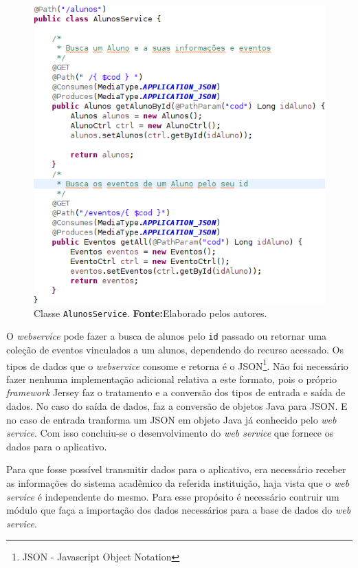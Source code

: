 		\begin{figure}[h!]
			\centerline{\includegraphics[scale=0.7]{./imagens/2_q_metodologico/qm13.png}}
			\caption[Classe \texttt{AlunosService}]{Classe \texttt{AlunosService}.
			\textbf{Fonte:}Elaborado pelos autores.}
			\label{fig:qm13}
		\end{figure}
		
		\par O \textit{webservice} pode fazer a busca de alunos pelo \texttt{id}
passado ou retornar uma coleção de eventos vinculados a um alunos, dependendo
do recurso acessado. Os tipos de dados que o \textit{webservice} consome e
retorna é o JSON\footnote{JSON - Javascript Object Notation}. Não foi
necessário fazer nenhuma implementação adicional relativa a este formato, pois
o próprio \textit{framework} Jersey faz o tratamento e a conversão dos tipos de
entrada e saída de dados. No caso do saída de dados, faz a conversão de objetos 
Java para JSON. E no caso de entrada tranforma um JSON em objeto
Java já conhecido pelo \textit{web service}. Com isso concluiu-se o
desenvolvimento do \textit{web service} que fornece os dados para o aplicativo.

	\par Para que fosse possível transmitir dados para o aplicativo, era
necessário receber as informações do sistema acadêmico da referida instituição,
haja vista que o \textit{web service} é independente do mesmo. Para esse
propósito é necessário  contruir um módulo que faça a importação dos dados
necessários para a base de dados do \textit{web service}. 

